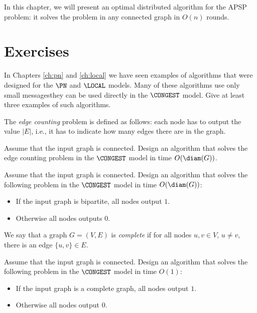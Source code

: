 In this chapter, we will present an optimal distributed algorithm for the APSP problem: it solves the problem in any connected graph in $O(n)$ rounds.


\section{Exercises}

\begin{ex}\label{ex:congest-prior}
    In Chapters \ref{ch:pn} and \ref{ch:local} we have seen examples of algorithms that were designed for the $\PN$ and $\LOCAL$ models. Many of these algorithms use only small messages\mydash they can be used directly in the $\CONGEST$ model. Give at least three examples of such algorithms.
\end{ex}

\begin{ex}
    The \emph{edge counting} problem is defined as follows: each node has to output the value $|E|$, i.e., it has to indicate how many edges there are in the graph.

    Assume that the input graph is connected. Design an algorithm that solves the edge counting problem in the $\CONGEST$ model in time $O(\diam(G))$.
\end{ex}

\begin{ex}
    Assume that the input graph is connected. Design an algorithm that solves the following problem in the $\CONGEST$ model in time $O(\diam(G))$:
    \begin{itemize}[noitemsep]
        \item If the input graph is bipartite, all nodes output $1$.
        \item Otherwise all nodes outputs $0$.
    \end{itemize}
\end{ex}

\begin{ex}
    We say that a graph $G = (V,E)$ is \emph{complete} if for all nodes $u, v \in V$, $u \ne v$, there is an edge $\{u,v\} \in E$.

    Assume that the input graph is connected. Design an algorithm that solves the following problem in the $\CONGEST$ model in time $O(1)$:
    \begin{itemize}[noitemsep]
        \item If the input graph is a complete graph, all nodes output $1$.
        \item Otherwise all nodes output $0$.
    \end{itemize}
\end{ex}

